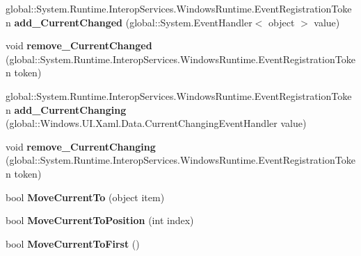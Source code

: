 \begin{DoxyCompactItemize}
global\+::\+System.\+Runtime.\+Interop\+Services.\+Windows\+Runtime.\+Event\+Registration\+Token {\bfseries add\+\_\+\+Current\+Changed} (global\+::\+System.\+Event\+Handler$<$ object $>$ value)
\item 
\mbox{\label{interface_windows_1_1_u_i_1_1_xaml_1_1_data_1_1_i_collection_view_a44b0918807f968027d0578f623c02f67}} 
void {\bfseries remove\+\_\+\+Current\+Changed} (global\+::\+System.\+Runtime.\+Interop\+Services.\+Windows\+Runtime.\+Event\+Registration\+Token token)
\item 
\mbox{\label{interface_windows_1_1_u_i_1_1_xaml_1_1_data_1_1_i_collection_view_afb83479ac9e19cc076a82ee507d64a75}} 
global\+::\+System.\+Runtime.\+Interop\+Services.\+Windows\+Runtime.\+Event\+Registration\+Token {\bfseries add\+\_\+\+Current\+Changing} (global\+::\+Windows.\+U\+I.\+Xaml.\+Data.\+Current\+Changing\+Event\+Handler value)
\item 
\mbox{\label{interface_windows_1_1_u_i_1_1_xaml_1_1_data_1_1_i_collection_view_aaeb8082e843bdfe31cc2c2cde59291c9}} 
void {\bfseries remove\+\_\+\+Current\+Changing} (global\+::\+System.\+Runtime.\+Interop\+Services.\+Windows\+Runtime.\+Event\+Registration\+Token token)
\item 
\mbox{\label{interface_windows_1_1_u_i_1_1_xaml_1_1_data_1_1_i_collection_view_aa3e3071eca08209ea25a6a0bb1f3171c}} 
bool {\bfseries Move\+Current\+To} (object item)
\item 
\mbox{\label{interface_windows_1_1_u_i_1_1_xaml_1_1_data_1_1_i_collection_view_ae88f3d07181d3a6e208afb6bda974829}} 
bool {\bfseries Move\+Current\+To\+Position} (int index)
\item 
\mbox{\label{interface_windows_1_1_u_i_1_1_xaml_1_1_data_1_1_i_collection_view_ad33f946fe8c227113abf86382ef89863}} 
bool {\bfseries Move\+Current\+To\+First} ()
\item 
\mbox{\label{interface_windows_1_1_u_i_1_1_xaml_1_1_data_1_1_i_collection_view_ae65c293d74c8ea11c12e336ac356a09b}} 

\end{DoxyCompactItemize}
